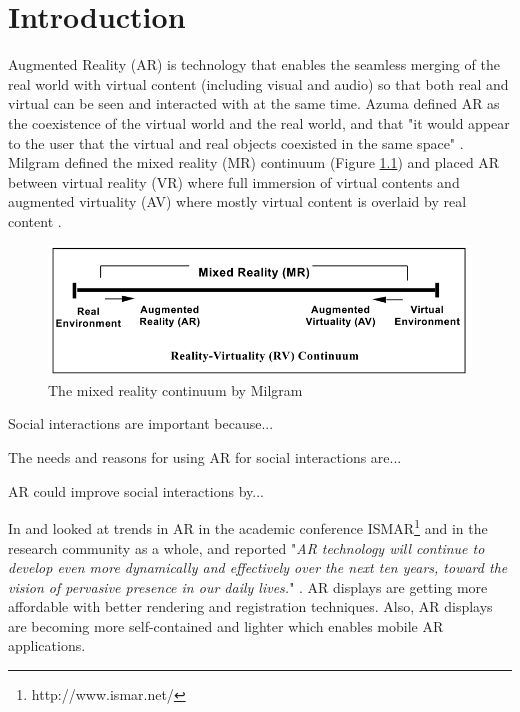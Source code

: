 \chapter{Introduction}
\label{ch:intro}

Augmented Reality (AR) is technology that enables the seamless merging of the real world with virtual content (including visual and audio) so that both real and virtual can be seen and interacted with at the same time. Azuma defined AR as the coexistence of the virtual world and the real world, and that "it would appear to the user that the virtual and real objects coexisted in the same space"  \cite{azuma1997survey}. Milgram defined the mixed reality (MR) continuum (Figure \ref{fig:mr-continuum}) and placed AR between virtual reality (VR) where full immersion of virtual contents and augmented virtuality (AV) where mostly virtual content is overlaid by real content \cite{Milgram1995a}. 


\begin{figure}
    \centering
    \includegraphics[width=.8\linewidth]{images/mixed-reality-continuum.png}
    \caption{The mixed reality continuum by Milgram \cite{Milgram1995a}}
    \label{fig:mr-continuum}
\end{figure}

Social interactions are important because...

The needs and reasons for using AR for social interactions are... 

AR could improve social interactions by... 


In \cite{Zhou2008} and \cite{Kim2018} looked at trends in AR in the academic conference ISMAR\footnote{http://www.ismar.net/} and in the research community as a whole, and reported "\textit{AR technology will continue to develop even more dynamically and effectively over the next ten years, toward the vision of pervasive presence in our daily lives.}" \cite{Kim2018}. AR displays are getting more affordable with better rendering and registration techniques. Also, AR displays are becoming more self-contained and lighter which enables mobile AR applications.

